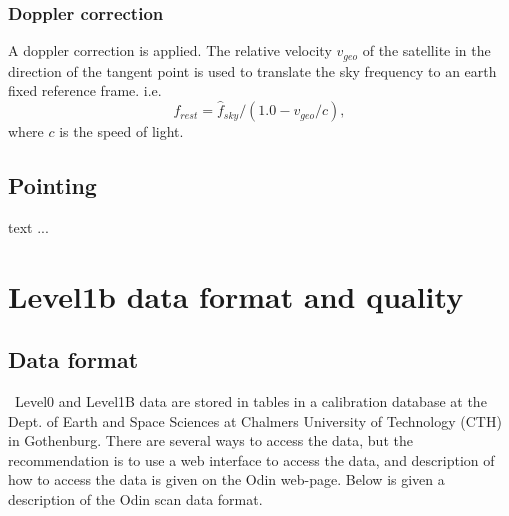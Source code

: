 

\subsection{Doppler correction}

A doppler correction is applied.
The relative velocity \(v_{geo}\) of the satellite in the direction
of the tangent point is used to translate the sky frequency to an 
earth fixed reference frame. i.e.
\begin{equation}
f_{rest} = \hat{f}_{sky}/(1.0 - v_{geo}/c),
\end{equation}
where \(c\) is the speed of light.

\section{Pointing}

text ...


\chapter{Level1b data format and quality}



\section{Data format}

\smr\ Level0 and Level1B data are stored in tables
in a calibration database at the Dept. of Earth and Space
Sciences at Chalmers University of Technology (CTH) in Gothenburg.
There are several ways to access the data, but the recommendation is to use a web 
interface to access the data, and description of how to access the data
is given on the Odin web-page. Below is given a description of the
Odin scan data format.


